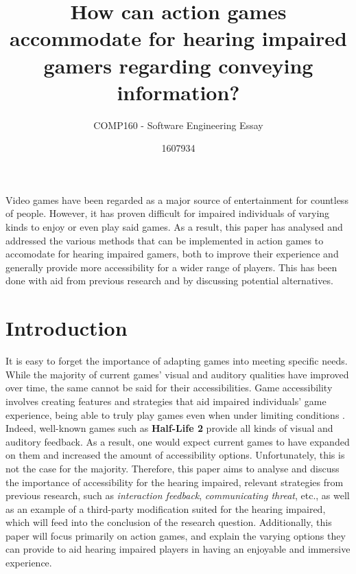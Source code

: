 \documentclass{scrartcl}
\title{How can action games accommodate for hearing impaired gamers regarding conveying information?}
\subtitle{COMP160 - Software Engineering Essay}
\author{1607934}
\begin{document}
\maketitle

\abstract
Video games have been regarded as a major source of entertainment for countless of people. However, it has proven difficult for impaired individuals of varying kinds to enjoy or even play said games. As a result, this paper has analysed and addressed the various methods that can be implemented in action games to accomodate for hearing impaired gamers, both to improve their experience and generally provide more accessibility for a wider range of players. This has been done with aid from previous research and by discussing potential alternatives.

\section{Introduction}
It is easy to forget the importance of adapting games into meeting specific needs. While the majority of current games' visual and auditory qualities have improved over time, the same cannot be said for their accessibilities. \cite{McPheron} Game accessibility involves creating features and strategies that aid impaired individuals' game experience, being able to truly play games even when under limiting conditions \cite{Bierre}. Indeed, well-known games such as \textbf{Half-Life 2} provide all kinds of visual and auditory feedback. \cite{Denise} \cite{Coutinho} As a result, one would expect current games to have expanded on them and increased the amount of accessibility options. Unfortunately, this is not the case for the majority. Therefore, this paper aims to analyse and discuss the importance of accessibility for the hearing impaired, relevant strategies from previous research, such as \textit{interaction feedback}, \textit{communicating threat}, etc., as well as an example of a third-party modification suited for the hearing impaired, which will feed into the conclusion of the research question. \cite{Denise} \cite{Arch} Additionally, this paper will focus primarily on action games, and explain the varying options they can provide to aid hearing impaired players in having an enjoyable and immersive experience.
\end{document}
